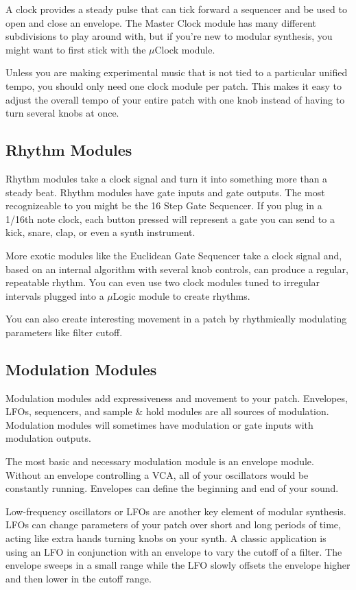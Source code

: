 \documentclass[11pt]{book}
\begin{document}
A clock provides a steady pulse that can tick forward a sequencer and be used to open and close an envelope. The Master Clock module has many different subdivisions to play around with, but if you're new to modular synthesis, you might want to first stick with the $\mu$Clock module.

Unless you are making experimental music that is not tied to a particular unified tempo, you should only need one clock module per patch. This makes it easy to adjust the overall tempo of your entire patch with one knob instead of having to turn several knobs at once.

\subsection{Rhythm Modules}

Rhythm modules take a clock signal and turn it into something more than a steady beat. Rhythm modules have gate inputs and gate outputs. The most recognizeable to you might be the 16 Step Gate Sequencer. If you plug in a 1/16th note clock, each button pressed will represent a gate you can send to a kick, snare, clap, or even a synth instrument.

More exotic modules like the Euclidean Gate Sequencer take a clock signal and, based on an internal algorithm with several knob controls, can produce a regular, repeatable rhythm. You can even use two clock modules tuned to irregular intervals plugged into a $\mu$Logic module to create rhythms.

You can also create interesting movement in a patch by rhythmically modulating parameters like filter cutoff.

\subsection{Modulation Modules}

Modulation modules add expressiveness and movement to your patch. Envelopes, LFOs, sequencers, and sample \& hold modules are all sources of modulation. Modulation modules will sometimes have modulation or gate inputs with modulation outputs.

The most basic and necessary modulation module is an envelope module. Without an envelope controlling a VCA, all of your oscillators would be constantly running. Envelopes can define the beginning and end of your sound.

Low-frequency oscillators or LFOs are another key element of modular synthesis. LFOs can change parameters of your patch over short and long periods of time, acting like extra hands turning knobs on your synth. A classic application is using an LFO in conjunction with an envelope to vary the cutoff of a filter. The envelope sweeps in a small range while the LFO slowly offsets the envelope higher and then lower in the cutoff range.
\end{document}
